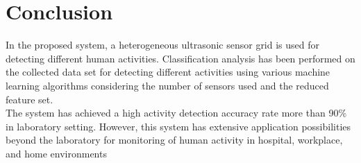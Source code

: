 \chapter{Conclusion}
In the proposed system, a heterogeneous ultrasonic sensor grid is used for detecting different human activities. Classiﬁcation analysis has been performed on the collected data set for detecting different activities using various machine learning algorithms considering the number of sensors used and the reduced feature set.\\ The system has achieved a high activity detection accuracy rate more than 90\% in laboratory setting. However, this system has extensive application possibilities beyond the laboratory for monitoring of human activity in hospital, workplace, and home environments


